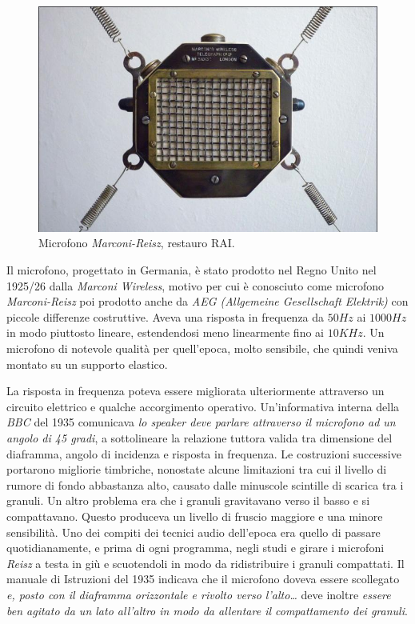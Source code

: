 \begin{refsection}
\begin{figure}[t]
\centering
\includegraphics[width=0.99\columnwidth]{CAPITOLI/0200/img/1321872621718Reisz8.jpg}
\caption[]{Microfono \emph{Marconi-Reisz}, restauro RAI.}
\label{mic:Marconi-Reisz}
\end{figure}

Il microfono, progettato in Germania, è stato prodotto nel Regno Unito nel 1925/26
dalla \emph{Marconi Wireless}, motivo per cui è conosciuto come microfono
\emph{Marconi-Reisz} poi prodotto anche da \emph{AEG (Allgemeine Gesellschaft
Elektrik)} con piccole differenze costruttive. Aveva una risposta in frequenza da $50Hz$ ai $1000Hz$ in modo
piuttosto lineare, estendendosi meno linearmente fino ai $10KHz$. Un microfono
di notevole qualità per quell’epoca, molto sensibile, che quindi veniva montato su un supporto elastico.

La risposta in frequenza poteva essere migliorata ulteriormente attraverso un
circuito elettrico e qualche accorgimento operativo. Un'informativa interna
della \emph{BBC} del 1935 comunicava \emph{lo speaker deve
parlare attraverso il microfono ad un angolo di 45 gradi}, a sottolineare la relazione tuttora valida
tra dimensione del diaframma, angolo di incidenza e risposta in frequenza.
Le costruzioni successive portarono migliorie timbriche, nonostate alcune limitazioni
tra cui il livello di rumore di fondo abbastanza alto, causato dalle minuscole
scintille di scarica tra i granuli.
Un altro problema era che i granuli gravitavano verso il basso e
si compattavano. Questo produceva un livello di fruscio maggiore e una minore
sensibilità. Uno dei compiti dei tecnici audio dell’epoca era quello di passare
quotidianamente, e prima di ogni programma, negli studi e girare i microfoni
\emph{Reisz} a testa in giù e scuotendoli in modo da ridistribuire i granuli compattati.
Il manuale di Istruzioni del 1935 indicava che
il microfono doveva essere scollegato \emph{e, posto con il diaframma orizzontale
e rivolto verso l'alto\ldots} deve inoltre \emph{essere ben agitato da un lato all'altro in
modo da allentare il compattamento dei granuli}.


\end{refsection}

